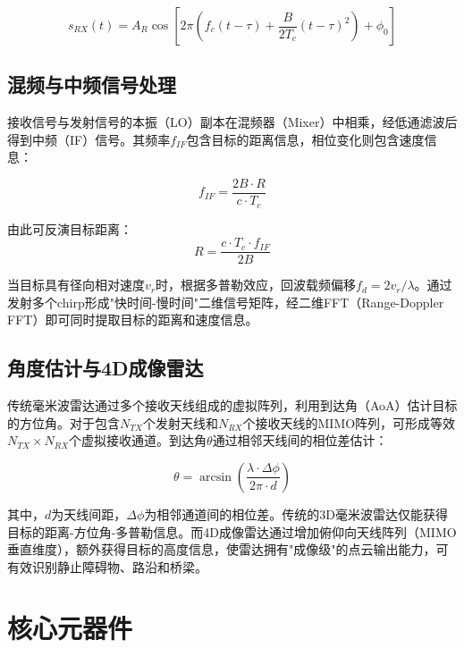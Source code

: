 \documentclass[12pt,a4paper,openany,UTF8]{ctexbook}
\begin{document}
\begin{equation}\label{eq:fmcw_rx}
s_{RX}(t) = A_R \cos\left[2\pi\left(f_c (t - \tau) + \frac{B}{2T_c} (t - \tau)^2\right) + \phi_0\right]
\end{equation}

\subsection{混频与中频信号处理}

接收信号与发射信号的本振（LO）副本在混频器（Mixer）中相乘，经低通滤波后得到中频（IF）信号。其频率$f_{IF}$包含目标的距离信息，相位变化则包含速度信息：

\begin{equation}\label{eq:fmcw_if}
f_{IF} = \frac{2B \cdot R}{c \cdot T_c}
\end{equation}

由此可反演目标距离：
\begin{equation}\label{eq:fmcw_range}
R = \frac{c \cdot T_c \cdot f_{IF}}{2B}
\end{equation}

当目标具有径向相对速度$v_r$时，根据多普勒效应，回波载频偏移$f_d = 2v_r / \lambda$。通过发射多个chirp形成"快时间-慢时间"二维信号矩阵，经二维FFT（Range-Doppler FFT）即可同时提取目标的距离和速度信息。

\subsection{角度估计与4D成像雷达}

传统毫米波雷达通过多个接收天线组成的虚拟阵列，利用到达角（AoA）估计目标的方位角。对于包含$N_{TX}$个发射天线和$N_{RX}$个接收天线的MIMO阵列，可形成等效$N_{TX} \times N_{RX}$个虚拟接收通道。到达角$\theta$通过相邻天线间的相位差估计：

\begin{equation}\label{eq:aoa}
\theta = \arcsin\left(\frac{\lambda \cdot \Delta\phi}{2\pi \cdot d}\right)
\end{equation}

其中，$d$为天线间距，$\Delta\phi$为相邻通道间的相位差。传统的3D毫米波雷达仅能获得目标的距离-方位角-多普勒信息。而4D成像雷达通过增加俯仰向天线阵列（MIMO垂直维度），额外获得目标的高度信息，使雷达拥有"成像级"的点云输出能力，可有效识别静止障碍物、路沿和桥梁。

\section{核心元器件}
\end{document}
